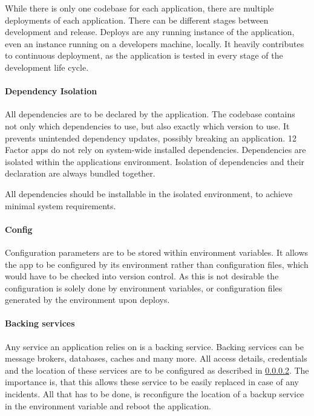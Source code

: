 While there is only one codebase for each application, there are multiple
deployments of each application. There can be different stages between
development and release. Deploys are any running instance of the application,
even an instance running on a developers machine, locally. It heavily
contributes to continuous deployment, as the application is tested in every
stage of the development life cycle.

\paragraph{Dependency Isolation}

All dependencies are to be declared by the application. The codebase contains
not only which dependencies to use, but also exactly which version to use. It
prevents unintended dependency updates, possibly breaking an application. 12
Factor apps do not rely on system-wide installed dependencies. Dependencies are
isolated within the applications environment. Isolation of dependencies and
their declaration are always bundled together.

All dependencies should be installable in the isolated environment, to achieve
minimal system requirements.

\paragraph{Config}
\label{para:12factor:config}

Configuration parameters are to be stored within environment variables. It
allows the app to be configured by its environment rather than configuration
files, which would have to be checked into version control. As this is not
desirable the configuration is solely done by environment variables, or
configuration files generated by the environment upon deploys.

\paragraph{Backing services}

Any service an application relies on is a backing service. Backing services can
be message brokers, databases, caches and many more. All access details,
credentials and the location of these services are to be configured as
described in \ref{para:12factor:config}. The importance is, that this allows
these service to be easily replaced in case of any incidents. All that has to
be done, is reconfigure the location of a backup service in the environment
variable and reboot the application.

